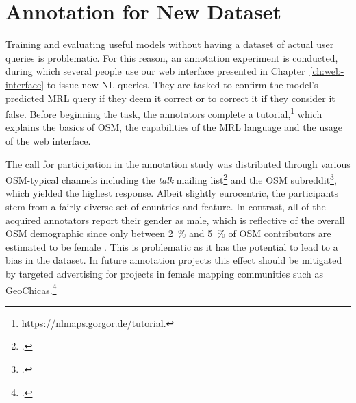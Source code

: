 \section{Annotation for New Dataset}
\label{sec:annotation}

Training and evaluating useful \nlmaps{} models without having a dataset of
actual user queries is problematic. For this reason, an annotation experiment is
conducted, during which several people use our web interface presented in
Chapter~\ref{ch:web-interface} to issue new NL queries. They are tasked to
confirm the model’s predicted MRL query if they deem it correct or to correct it
if they consider it false. Before beginning the task, the annotators complete a
tutorial,\footnote{\url{https://nlmaps.gorgor.de/tutorial}.} which explains
the basics of OSM, the capabilities of the MRL language and the usage of the web
interface.

The call for participation in the annotation study was distributed through
various OSM-typical channels including the \emph{talk} mailing
list\footcite{osm-talk} and the OSM subreddit\footcite{osm-subreddit}, which
yielded the highest response. Albeit slightly eurocentric, the participants stem
from a fairly diverse set of countries and feature. In contrast, all of the
acquired annotators report their gender as male, which is reflective of the
overall OSM demographic since only between \SI{2}{\%} and \SI{5}{\%} of OSM
contributors are estimated to be female
\parencites{budhathoki-2010}{stark-2010}{lechner-2011}{klettner-2013}{das-2019}.
This is problematic as it has the potential to lead to a bias in the dataset. In
future annotation projects this effect should be mitigated by targeted
advertising for projects in female mapping communities such as GeoChicas.\footcite{geochicas}

